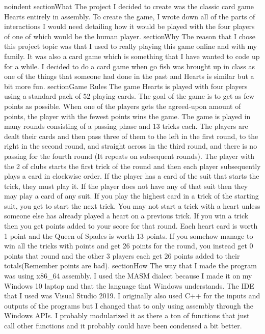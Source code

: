 noindent
section{What}
The project I decided to create was the classic card game Hearts entirely in assembly. To create the game, I wrote down all of the parts of interactions I would need detailing how it would be played with the four players of one of which would be the human player.
section{Why}
The reason that I chose this project topic was that I used to really playing this game online and with my family. It was also a card game which is something that I have wanted to code up for a while. I decided to do a card game when go fish was brought up in class as one of the things that someone had done in the past and Hearts is similar but a bit more fun.
section{Game Rules}
The game Hearts is played with four players using a standard pack of 52 playing cards. The goal of the game is to get as few points as possible. When one of the players gets the agreed-upon amount of points, the player with the fewest points wins the game. The game is played in many rounds consisting of a passing phase and 13 tricks each. The players are dealt their cards and then pass three of them to the left in the first round, to the right in the second round, and straight across in the third round, and there is no passing for the fourth round (It repeats on subsequent rounds). The player with the 2 of clubs starts the first trick of the round and then each player subsequently plays a card in clockwise order. If the player has a card of the suit that starts the trick, they must play it. If the player does not have any of that suit then they may play a card of any suit. If you play the highest card in a trick of the starting suit, you get to start the next trick. You may not start a trick with a heart unless someone else has already played a heart on a previous trick. If you win a trick then you get points added to your score for that round. Each heart card is worth 1 point and the Queen of Spades is worth 13 points. If you somehow manage to win all the tricks with points and get 26 points for the round, you instead get 0 points that round and the other 3 players each get 26 points added to their totals(Remember points are bad).
section{How}
The way that I made the program was using x86_64 assembly. I used the MASM dialect because I made it on my Windows 10 laptop and that the language that Windows understands. The IDE that I used was Visual Studio 2019. I originally also used C++ for the inputs and outputs of the programs but I changed that to only using assembly through the Windows APIs. I probably modularized it as there a ton of functions that just call other functions and it probably could have been condensed a bit better.

